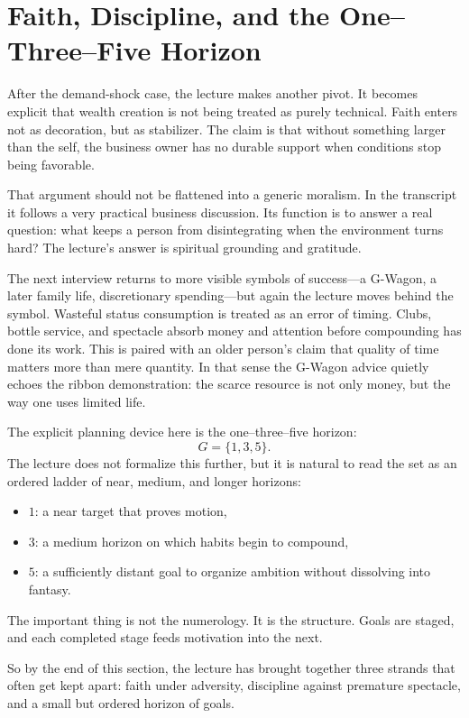 \section{Faith, Discipline, and the One--Three--Five Horizon}

After the demand-shock case, the lecture makes another pivot. It becomes explicit that wealth creation is not being treated as purely technical. Faith enters not as decoration, but as stabilizer. The claim is that without something larger than the self, the business owner has no durable support when conditions stop being favorable.

That argument should not be flattened into a generic moralism. In the transcript it follows a very practical business discussion. Its function is to answer a real question: what keeps a person from disintegrating when the environment turns hard? The lecture's answer is spiritual grounding and gratitude.

The next interview returns to more visible symbols of success---a G-Wagon, a later family life, discretionary spending---but again the lecture moves behind the symbol. Wasteful status consumption is treated as an error of timing. Clubs, bottle service, and spectacle absorb money and attention before compounding has done its work. This is paired with an older person's claim that quality of time matters more than mere quantity. In that sense the G-Wagon advice quietly echoes the ribbon demonstration: the scarce resource is not only money, but the way one uses limited life.

The explicit planning device here is the one--three--five horizon:
\begin{equation}
G=\{1,3,5\}.
\end{equation}
The lecture does not formalize this further, but it is natural to read the set as an ordered ladder of near, medium, and longer horizons:
\begin{itemize}
\item \(1\): a near target that proves motion,
\item \(3\): a medium horizon on which habits begin to compound,
\item \(5\): a sufficiently distant goal to organize ambition without dissolving into fantasy.
\end{itemize}
The important thing is not the numerology. It is the structure. Goals are staged, and each completed stage feeds motivation into the next.

So by the end of this section, the lecture has brought together three strands that often get kept apart: faith under adversity, discipline against premature spectacle, and a small but ordered horizon of goals.


